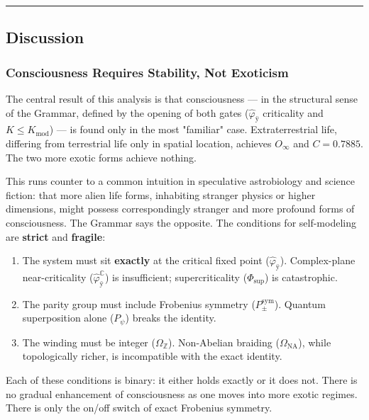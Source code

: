 \documentclass[12pt,a4paper]{article}
\begin{document}
\begin{center}
\rule{0.5\textwidth}{0.4pt}
\end{center}

\subsection{Discussion}

\subsubsection{Consciousness Requires Stability, Not Exoticism}

The central result of this analysis is that consciousness --- in the structural sense of the Grammar, defined by the opening of both gates ($\hat{\varphi}_{\text{ÿ}}$ criticality and $K \leq K_{\text{mod}}$) --- is found only in the most "familiar" case. Extraterrestrial life, differing from terrestrial life only in spatial location, achieves $O_{\infty}$ and $C = 0.7885$. The two more exotic forms achieve nothing.

This runs counter to a common intuition in speculative astrobiology and science fiction: that more alien life forms, inhabiting stranger physics or higher dimensions, might possess correspondingly stranger and more profound forms of consciousness. The Grammar says the opposite. The conditions for self-modeling are \textbf{strict} and \textbf{fragile}:

\begin{enumerate}
    \item The system must sit \textbf{exactly} at the critical fixed point ($\hat{\varphi}_{\text{ÿ}}$). Complex-plane near-criticality ($\hat{\varphi}_{\text{ÿ}}^{\mathbb{C}}$) is insufficient; supercriticality ($\Phi_{\text{sup}}$) is catastrophic.
    \item The parity group must include Frobenius symmetry ($P_{\pm}^{\text{sym}}$). Quantum superposition alone ($P_{\psi}$) breaks the identity.
    \item The winding must be integer ($\Omega_{\mathbb{Z}}$). Non-Abelian braiding ($\Omega_{\text{NA}}$), while topologically richer, is incompatible with the exact identity.
\end{enumerate}

Each of these conditions is binary: it either holds exactly or it does not. There is no gradual enhancement of consciousness as one moves into more exotic regimes. There is only the on/off switch of exact Frobenius symmetry.
\end{document}
